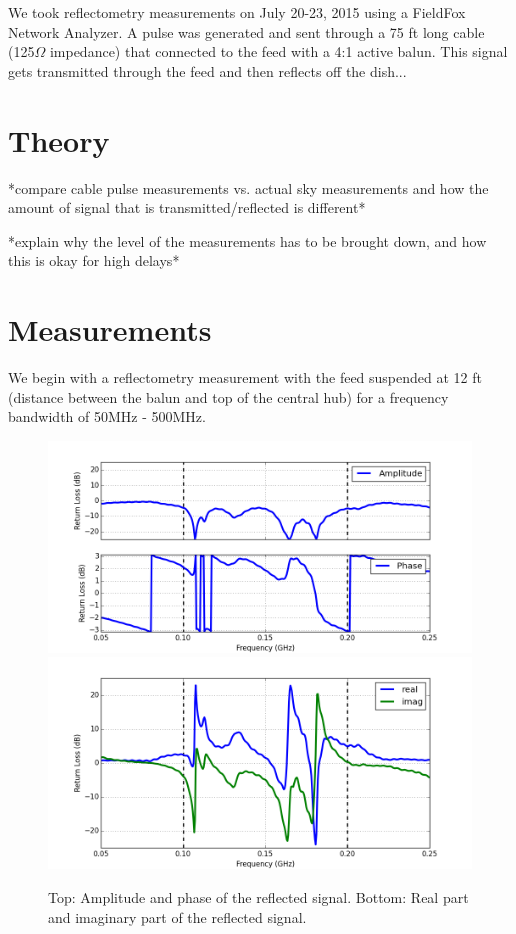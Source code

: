 \documentclass[12pt,preprint]{aastex}
\begin{document}
We took reflectometry measurements on July 20-23, 2015 using a FieldFox Network Analyzer. A pulse was generated and sent through a 75 ft long cable (125$\Omega$ impedance) that connected to the feed with a 4:1 active balun. This signal gets transmitted through the feed and then reflects off the dish...

\section{Theory}

*compare cable pulse measurements vs. actual sky measurements and how the amount of signal that is transmitted/reflected is different*

*explain why the level of the measurements has to be brought down, and how this is okay for high delays*

\section{Measurements}

We begin with a reflectometry measurement with the feed suspended at 12 ft (distance between the balun and top of the central hub) for a frequency bandwidth of 50MHz - 500MHz.

\begin{figure}[H]
\centering
\includegraphics[totalheight=0.4\textheight]{plots/frequency_amp_phase.png}
\includegraphics[totalheight=0.4\textheight]{plots/frequency_real_imag.png}
\caption{Top: Amplitude and phase of the reflected signal. Bottom: Real part and imaginary part of the reflected signal.}
\end{figure}
\end{document}
